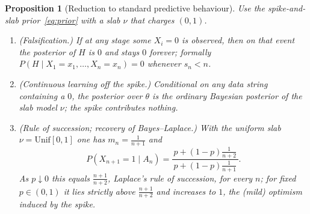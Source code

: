 \documentclass{amsart}
\newtheorem{proposition}{Proposition}
\theoremstyle{definition}
\begin{document}
\begin{proposition}[Reduction to standard predictive behaviour]\label{prop:predictive}
Use the spike-and-slab prior~\eqref{eq:prior} with a slab $\nu$ that charges
$(0,1)$.
\begin{enumerate}
\item[\textup{(a)}] \emph{(Falsification.)} If at any stage some $X_i=0$ is
observed, then on that event the posterior of $H$ is $0$ and stays $0$ forever;
formally $P(H\mid X_1=x_1,\dots,X_n=x_n)=0$ whenever $s_n<n$.
\item[\textup{(b)}] \emph{(Continuous learning off the spike.)} Conditional on
any data string containing a $0$, the posterior over $\theta$ is the ordinary
Bayesian posterior of the slab model $\nu$; the spike contributes nothing.
\item[\textup{(c)}] \emph{(Rule of succession; recovery of Bayes--Laplace.)}
With the uniform slab $\nu=\mathrm{Unif}[0,1]$ one has $m_n=\frac1{n+1}$ and
\[
  P(X_{n+1}=1\mid A_n)=\frac{p+(1-p)\frac{1}{n+2}}{\,p+(1-p)\frac{1}{n+1}\,}.
\]
As $p\downarrow0$ this equals $\tfrac{n+1}{n+2}$, Laplace's rule of succession,
for every $n$; for fixed $p\in(0,1)$ it lies strictly above $\tfrac{n+1}{n+2}$
and increases to $1$, the (mild) optimism induced by the spike.
\end{enumerate}
\end{proposition}
\end{document}
